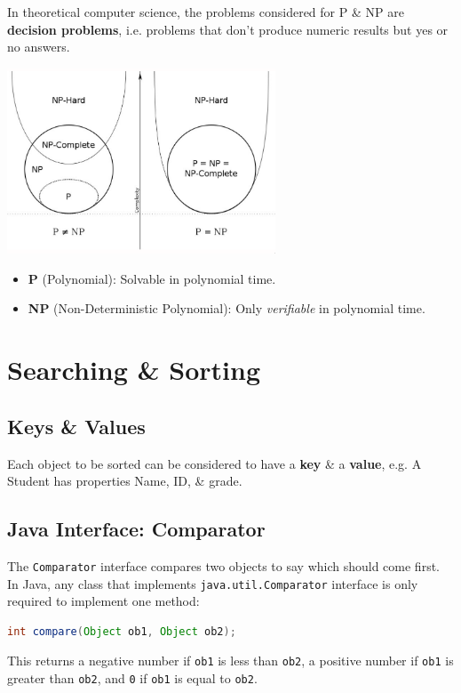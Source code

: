 \documentclass[11pt]{article}
\begin{document}
In theoretical computer science, the problems considered for P \& NP are \textbf{decision problems}, i.e. problems that don't produce 
numeric results but yes or no answers. 

\begin{center}
    \includegraphics[width=0.6\textwidth]{pvsnp.png}
\end{center}

\begin{itemize}
    \item   \textbf{P} (Polynomial): Solvable in polynomial time. 
    \item   \textbf{NP} (Non-Deterministic Polynomial): Only \textit{verifiable} in polynomial time. 
\end{itemize}

\section{Searching \& Sorting}
\subsection{Keys \& Values}
Each object to be sorted can be considered to have a \textbf{key} \& a \textbf{value}, e.g. A Student has properties Name, ID, \& grade.

\subsection{Java Interface: Comparator} 
The \verb|Comparator| interface compares two objects to say which should come first. 
In Java, any class that implements \verb|java.util.Comparator| interface is only required to implement one method: 
\begin{lstlisting}[language=java] 
int compare(Object ob1, Object ob2); 
\end{lstlisting}

This returns a negative number if \verb|ob1| is less than \verb|ob2|, a positive number if \verb|ob1| is greater than \verb|ob2|, and \verb|0| if \verb|ob1| is equal to \verb|ob2|. 
\end{document}
